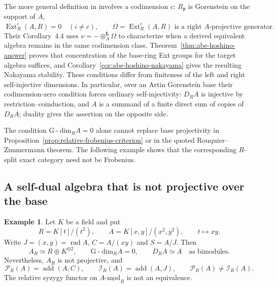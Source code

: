 \documentclass[12pt,a4paper,english,reqno]{amsart}
\numberwithin{equation}{section}
\theoremstyle{plain}
\theoremstyle{definition}
\newtheorem{example}[theorem]{Example}
\begin{document}
The more general definition in
\cite[Definition~2.1]{AbeHoshino2009} involves a codimension $c$:
$R_{\mathfrak p}$ is
Gorenstein on the support of $A$,
\[
 \operatorname{Ext}_R^i(A,R)=0\quad(i\ne c),
 \qquad \Omega=\operatorname{Ext}_R^c(A,R)
       \text{ is a right }A\text{-projective generator}.
\]
Their Corollary~4.4 uses
$\nu=-\otimes_A^{\mathbf L}\Omega$ to characterize when
a derived equivalent algebra remains in the same codimension
class. Theorem~\ref{thm:abe-hoshino-answer} proves that concentration
of the base-ring Ext groups for the target algebra suffices, and
Corollary~\ref{cor:abe-hoshino-nakayama} gives the resulting
Nakayama stability. These conditions differ from finiteness of the left and
right self-injective dimensions.  In particular, over an Artin
Gorenstein base their
codimension-zero condition forces ordinary self-injectivity:
$D_RA$ is injective by restriction--coinduction, and $A$ is a
summand of a finite direct sum of copies of $D_RA$; duality
gives the assertion on the opposite side.

The condition $\mathrm{G\!\operatorname{-}dim}_R A=0$ alone
cannot replace base projectivity in
Proposition~\ref{prop:relative-frobenius-criterion} or in the
quoted Rouquier--Zimmermann theorem.  The following example shows
that the corresponding $R$-split
exact category need not be Frobenius.

\subsection{A self-dual algebra that is not projective over the base}

\begin{example}\label{ex:abe-nonprojective-relative}
Let $K$ be a field and put
\[
 R=K[t]/(t^2),\qquad
 A=K[x,y]/(x^2,y^2),\qquad t\longmapsto xy.
\]
Write $J=(x,y)=\operatorname{rad}A$,
$C=A/(xy)$ and $S=A/J$.  Then
\begin{equation}
 A_R\simeq R\oplus K^{\oplus2},\qquad
 \mathrm{G\!\operatorname{-}dim}_R A=0,
 \qquad D_RA\simeq A\quad\text{as bimodules}.
 \label{eq:abe-example-duality}
\end{equation}
Nevertheless, $A_R$ is not projective, and
\begin{equation}
 \mathcal P_R(A)=\operatorname{add}(A,C),\qquad
 \mathcal I_R(A)=\operatorname{add}(A,J),
 \qquad \mathcal P_R(A)\ne\mathcal I_R(A).
 \label{eq:abe-example-classes}
\end{equation}
The relative syzygy functor on
$A\text{-}\underline{\mathrm{mod}}_R$ is not an equivalence.
\end{example}
\end{document}
